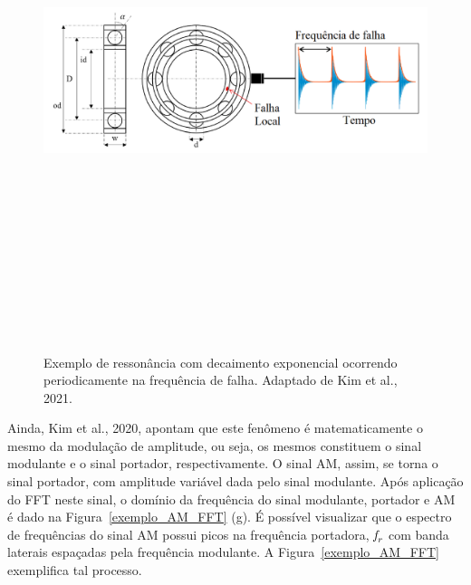 \documentclass[
	12pt,				
	oneside,			
	a4paper,			
	english,			
	brazil,			
	]{abntex2ppgsi}
\newcommand{\f}{\mkern-2mu f\mkern-3mu}
\begin{document}
\begin{figure}[!htb]
\centering
\caption {Exemplo de ressonância com decaimento exponencial ocorrendo periodicamente na frequência de falha. Adaptado de Kim et al., 2021.}
\includegraphics[width=\textwidth,height=150mm,keepaspectratio]{exemplo_ressonancia_falha}
\label{exemplo_ressonancia_falha}
\end{figure}

Ainda, Kim et al., 2020, apontam que este fenômeno é matematicamente o mesmo da modulação de amplitude, ou seja, os mesmos constituem o sinal modulante e o sinal portador, respectivamente. O sinal AM, assim, se torna o sinal portador, com amplitude variável dada pelo sinal modulante. Após aplicação do FFT neste sinal, o domínio da frequência do sinal modulante, portador e AM é dado na Figura~\ref{exemplo_AM_FFT} (g). É possível visualizar que o espectro de frequências do sinal AM possui picos na frequência portadora, ${\f}_r$ com banda laterais espaçadas pela frequência modulante. A Figura~\ref{exemplo_AM_FFT} exemplifica tal processo. 
\end{document}
